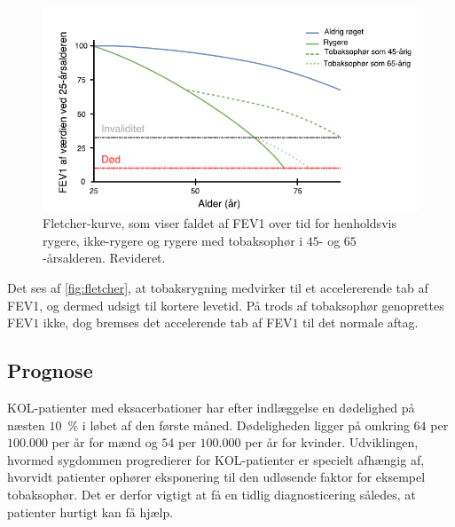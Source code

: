 \begin{figure} [H]
\centering
\includegraphics[width=1\textwidth]{figures/fletcher}
\caption{Fletcher-kurve, som viser faldet af FEV1 over tid for henholdsvis rygere, ikke-rygere og rygere med tobaksophør i $45$- og $65$-årsalderen. Revideret\cite{Basisbogen2016}.}
\label{fig:fletcher}
\end{figure} 

\noindent
Det ses af \autoref{fig:fletcher}, at tobaksrygning medvirker til et accelererende tab af FEV1, og dermed udsigt til kortere levetid. På trods af tobaksophør genoprettes FEV$1$ ikke, dog bremses det accelerende tab af FEV$1$ til det normale aftag.\cite{dsam2016}

\subsection{Prognose}
KOL-patienter med eksacerbationer har efter indlæggelse en dødelighed på næsten $10$~$\%$ i løbet af den første måned. Dødeligheden ligger på omkring $64$ per $100.000$ per år for mænd og $54$ per $100.000$ per år for kvinder.
Udviklingen, hvormed sygdommen progredierer for KOL-patienter er specielt afhængig af, hvorvidt patienter ophører eksponering til den udløsende faktor for eksempel tobaksophør. Det er derfor vigtigt at få en tidlig diagnosticering således, at patienter hurtigt kan få hjælp.\cite{dsam2016}

